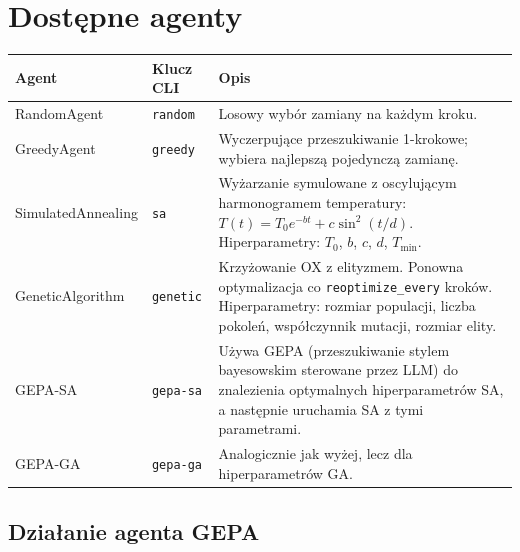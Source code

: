 \documentclass[11pt,a4paper]{article}
\begin{document}
\section{Dostępne agenty}

\begin{longtable}{@{}p{3.8cm} p{2.5cm} p{8.2cm}@{}}
\toprule
\textbf{Agent} & \textbf{Klucz CLI} & \textbf{Opis} \\
\midrule
\endhead
RandomAgent        & \texttt{random}  & Losowy wybór zamiany na każdym kroku. \\[4pt]
GreedyAgent        & \texttt{greedy}  & Wyczerpujące przeszukiwanie 1-krokowe;
                                        wybiera najlepszą pojedynczą zamianę. \\[4pt]
SimulatedAnnealing & \texttt{sa}      & Wyżarzanie symulowane z oscylującym
                                        harmonogramem temperatury:
                                        $T(t) = T_0 e^{-bt} + c\sin^2(t/d)$.
                                        Hiperparametry: $T_0$, $b$, $c$, $d$, $T_{\min}$. \\[4pt]
GeneticAlgorithm   & \texttt{genetic} & Krzyżowanie OX z elityzmem.
                                        Ponowna optymalizacja co
                                        \texttt{reoptimize\_every} kroków.
                                        Hiperparametry: rozmiar populacji,
                                        liczba pokoleń, współczynnik mutacji,
                                        rozmiar elity. \\[4pt]
GEPA-SA            & \texttt{gepa-sa} & Używa GEPA (przeszukiwanie stylem
                                        bayesowskim sterowane przez LLM) do
                                        znalezienia optymalnych hiperparametrów SA,
                                        a następnie uruchamia SA z tymi parametrami. \\[4pt]
GEPA-GA            & \texttt{gepa-ga} & Analogicznie jak wyżej, lecz dla
                                        hiperparametrów GA. \\
\bottomrule
\end{longtable}

\subsection{Działanie agenta GEPA}
\end{document}
